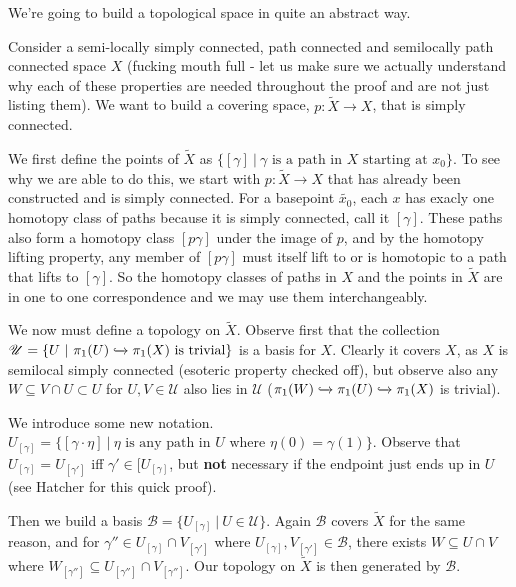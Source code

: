 \documentclass[10pt]{article}
\begin{document}
\begin{example}
	We're going to build a topological space in quite an abstract way.

	Consider a semi-locally simply connected, path connected and semilocally path
	connected space $X$ (fucking mouth full - let us make sure we actually understand why
	each of these properties are needed throughout the proof and are not just
	listing them). We want to build a covering space, $p: \tilde{X} \to X$, that
	is simply connected.

	We first define the points of $\tilde{X}$ as $\{ [\gamma] ~|~ \gamma \text{ is a path in } X \text{ starting at } x_0\}$. To see why we are able to do this, we start with $p: \tilde{X} \to X$ that has already been constructed
	and is simply connected. For a basepoint $\tilde{x_0}$, each $x$ has exacly
	one homotopy class of paths because it is simply connected, call it $[ \gamma
	]$. These paths also form a homotopy class $[ p\gamma ]$ under the image of $p$, and by the homotopy lifting
	property, any member of $[ p\gamma ]$ must itself lift to or is homotopic to
	a path that lifts to $ [\gamma ]$. So the homotopy classes of paths in $X$
	and the points in $\tilde{X}$ are in one to one correspondence and we may use
	them interchangeably.

	We now must define a topology on $\tilde{X}$. Observe first that the
	collection $\mathscr{U} = \{ U ~|~ \pi_1(U) \xhookrightarrow{}{\pi_1(X)
	\text{ is trivial}}\}$ is a basis for $X$. Clearly it covers $X$, as $X$ is
	semilocal simply connected (esoteric property checked off), but observe also any $W \subseteq V \cap U \subset U$
	for $U, V \in \mathscr{U}$ also lies in $\mathscr{U}$ ($\pi_1(W) \xhookrightarrow{}{
	\pi_1(U)} \xhookrightarrow{}{\pi_1(X)}$ is trivial).

	We introduce some new notation. $U_{[\gamma]} = \{ [\gamma \cdot \eta] ~|~
	\eta \text{ is any path in } U \text{ where } \eta(0) = \gamma(1) \}$.
	Observe that $U_{[\gamma]} = U_{[\gamma']}$ iff $\gamma' \in [U_{[\gamma]}$, but
	\textbf{not} necessary if the endpoint just ends up in $U$ (see Hatcher for
	this quick proof).

	Then we build a basis $\mathscr{B} = \{ U_{[\gamma]} ~|~ U \in \mathscr{U}
	\}$.  Again $\mathscr{B}$ covers $\tilde{X}$ for the same reason, and for
	$\gamma'' \in U_{[\gamma]} \cap V_{[\gamma']}$ where $U_{[\gamma]},
	V_{[\gamma']} \in \mathscr{B}$, there exists $W \subseteq U \cap V$ where
	$W_{[\gamma'']} \subseteq U_{[\gamma'']} \cap V_{[\gamma'']}$. Our topology
	on $\tilde{X}$ is then generated by $\mathscr{B}$.


\end{example}
\end{document}
